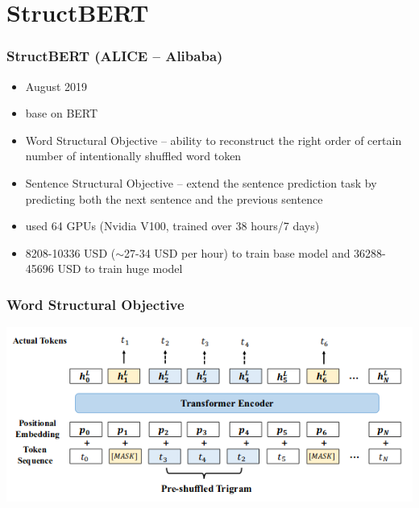 \documentclass{beamer}
\begin{document}
\section{StructBERT}
\begin{frame}
    \frametitle{StructBERT (ALICE -- Alibaba) \cite{structbert}}
    \begin{itemize}
        \item August 2019
        \item base on BERT
        \item Word Structural Objective -- ability to reconstruct the right order of certain number of intentionally shuffled word token
        \item Sentence Structural Objective -- extend the sentence prediction task by predicting both the next sentence and the previous sentence
        \item used 64 GPUs (Nvidia V100, trained over 38 hours/7 days)
        \item 8208-10336 USD ($\sim$27-34 USD per hour) to train base model and 36288-45696 USD to train huge model
    \end{itemize}
\end{frame}

\begin{frame}
    \frametitle{Word Structural Objective}
    \begin{center}
        \includegraphics[scale=1.35]{img/StructBERT-wso.png}
    \end{center}
\end{frame}
\end{document}
